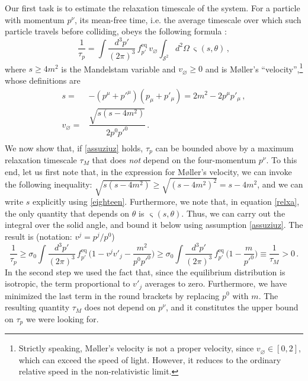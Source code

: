 \documentclass[a4paper, amsfonts, amssymb, amsmath, reprint, showkeys, nofootinbib, twoside, onecolumn,notitlepage]{revtex4-2}
\theoremstyle{definition}
\theoremstyle{theorem}
\theoremstyle{corollary}
\begin{document}
Our first task is to estimate the relaxation timescale of the system.
For a particle with momentum $p^\nu$, its mean-free time, i.e. the average timescale over which such particle travels before colliding, obeys the following formula \cite{Strain2010}:
\begin{equation}\label{relxa}
 \dfrac{1}{\tau_p} = \int \dfrac{d^3 p'}{(2\pi)^3} \, f^{\text{eq}}_{p'} \, v_\varnothing  \int_{\mathcal{S}^2} d^2\Omega \, \upvarsigma(s,\theta) \, ,   
\end{equation}
where $s \geq 4m^2$ is the Mandelstam variable and $v_\varnothing \geq 0$ and is M\o ller's ``velocity'',\footnote{Strictly speaking, M\o ller's velocity is not a proper velocity, since $v_\varnothing \in [0,2]$, which can exceed the speed of light. However, it reduces to the ordinary relative speed in the non-relativistic limit.} whose definitions are
\begin{equation}\label{eighteen}
\begin{split}
s={}& -(p^\mu {+} p'^\mu)(p_\mu {+} p'_\mu)=2m^2-2p^\mu p'_\mu \, , \\
v_\varnothing ={}& \dfrac{\sqrt{s(s-4m^2)}}{2p^0 p'^0} \, .\\
\end{split}
\end{equation}
We now show that, if \eqref{assuziuz} holds, $\tau_p$ can be bounded above by a maximum relaxation timescale $\tau_M$ that does \textit{not} depend on the four-momentum $p^\nu$. To this end, let us first note that, in the expression for M\o ller's velocity, we can invoke the following inequality: $\sqrt{s(s{-}4m^2)}\geq \sqrt{(s{-}4m^2)^2}=s-4m^2$, and we can write $s$ explicitly using \eqref{eighteen}. Furthermore, we note that, in equation \eqref{relxa}, the only quantity that depends on $\theta$ is $\upvarsigma(s,\theta)$. Thus, we can carry out the integral over the solid angle, and bound it below using assumption \eqref{assuziuz}. The result is (notation: $v^j=p^j/p^0$)
\begin{equation}\label{boundone}
\dfrac{1}{\tau_p} \geq \sigma_0 \int \dfrac{d^3 p'}{(2\pi)^3} \, f^{\text{eq}}_{p'} \, \bigg(1-v^j v'_j -\dfrac{m^2}{p^0 p'^0} \bigg) \geq \sigma_0 \int \dfrac{d^3 p'}{(2\pi)^3} \, f^{\text{eq}}_{p'} \, \bigg(1 -\dfrac{m}{p'^0} \bigg) \equiv \dfrac{1}{\tau_M} >0  \, .  
\end{equation}
In the second step we used the fact that, since the equilibrium distribution is isotropic, the term proportional to $v'_j$ averages to zero. Furthermore, we have minimized the last term in the round brackets by replacing $p^0$ with $m$. The resulting quantity $\tau_M$ does not depend on $p^\nu$, and it constitutes the upper bound on $\tau_p$ we were looking for.
\end{document}
